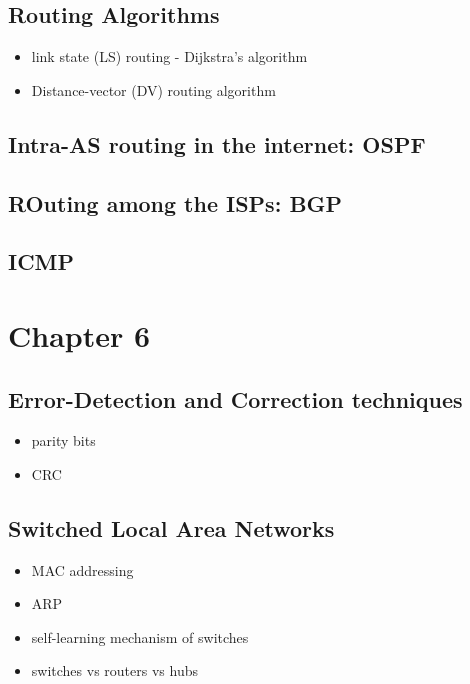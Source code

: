 \documentclass[11pt]{article}
\begin{document}
\subsection{Routing Algorithms}
\label{sec:org26ec236}
\begin{itemize}
\item link state (LS) routing - Dijkstra's algorithm
\item Distance-vector (DV) routing algorithm
\end{itemize}

\subsection{Intra-AS routing in the internet: OSPF}
\label{sec:org126fb77}

\subsection{ROuting among the ISPs: BGP}
\label{sec:org1505628}

\subsection{ICMP}
\label{sec:org0b1831d}

\section{Chapter 6}
\label{sec:org422acf2}
\subsection{Error-Detection and Correction techniques}
\label{sec:org18712f1}
\begin{itemize}
\item parity bits
\item CRC
\end{itemize}

\subsection{Switched Local Area Networks}
\label{sec:org520bc04}
\begin{itemize}
\item MAC addressing
\item ARP
\item self-learning mechanism of switches
\item switches vs routers vs hubs
\end{itemize}

\end{document}
